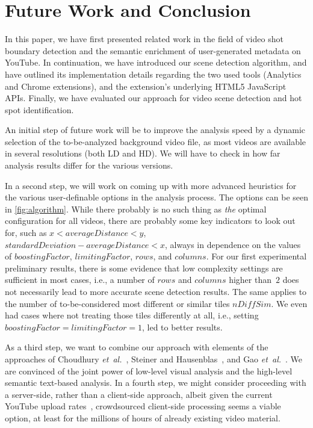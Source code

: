 \documentclass[10pt,twocolumn,letterpaper]{article}
\begin{document}
\section{Future Work and Conclusion} \label{sec:future-work-conclusion}
In this paper, we have first presented related work in the field of video shot boundary detection and the semantic enrichment of user-generated metadata on YouTube. In continuation, we have introduced our scene detection algorithm, and have outlined its implementation details regarding the two used tools (Analytics and Chrome extensions), and the extension's underlying HTML5 JavaScript APIs. Finally, we have evaluated our approach for video scene detection and hot spot identification.

An initial step of future work will be to improve the analysis speed by a dynamic selection of the to-be-analyzed background video file, as most videos are available in several resolutions (both LD and HD). We will have to check in how far analysis results differ for the various versions.

In a second step, we will work on coming up with more advanced heuristics for the various user-definable options in the analysis process. The options can be seen in \autoref{fig:algorithm}. While there probably is no such thing as \emph{the} optimal configuration for all videos, there are probably some key indicators to look out for, such as $x < \mathit{averageDistance}  < y$, $\mathit{standardDeviation} - \mathit{averageDistance} < x$, always in dependence on the values of $\mathit{boostingFactor}$, $\mathit{limitingFactor}$, $\mathit{rows}$, and $\mathit{columns}$. For our first experimental preliminary results, there is some evidence that low complexity settings are sufficient in most cases, i.e., a number of $\mathit{rows}$ and $\mathit{columns}$ higher than~$2$ does not necessarily lead to more accurate scene detection results. The same applies to the number of to-be-considered most different or similar tiles $\mathit{nDiffSim}$. We even had cases where not treating those tiles differently at all, i.e., setting $\mathit{boostingFactor} = \mathit{limitingFactor} = 1$, led to better results.

As a third step, we want to combine our approach with elements of the approaches of Choudhury \emph{et~al.}~\cite{Choudhury:YouTube}, Steiner and Hausenblas~\cite{semwebvid}, and Gao \emph{et~al.}~\cite{Gao:2009}. We are convinced of the joint power of low-level visual analysis and the high-level semantic text-based analysis. In a fourth step, we might consider proceeding with a server-side, rather than a client-side approach, albeit given the current YouTube upload rates~\cite{youtube:stats}, crowdsourced client-side processing seems a viable option, at least for the millions of hours of already existing video material.
\end{document}
